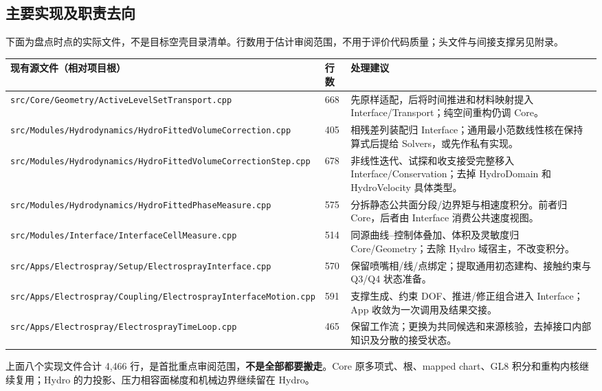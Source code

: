 \documentclass[UTF8,a4paper,11pt,fontset=fandol]{ctexart}
\newcommand{\code}[1]{\nolinkurl{#1}}
\begin{document}
\subsection{主要实现及职责去向}
下面为盘点时点的实际文件，不是目标空壳目录清单。行数用于估计审阅范围，不用于评价代码质量；头文件与间接支撑另见附录。
\begin{longtable}{@{}P{.42\textwidth}P{.09\textwidth}P{.43\textwidth}@{}}
\toprule 现有源文件（相对项目根） & 行数 & 处理建议\\\midrule\endhead
\code{src/Core/Geometry/ActiveLevelSetTransport.cpp} & 668 & 先原样适配，后将时间推进和材料映射提入 Interface/Transport；纯空间重构仍调 Core。\\
\code{src/Modules/Hydrodynamics/HydroFittedVolumeCorrection.cpp} & 405 & 相残差列装配归 Interface；通用最小范数线性核在保持算式后提给 Solvers，或先作私有实现。\\
\code{src/Modules/Hydrodynamics/HydroFittedVolumeCorrectionStep.cpp} & 678 & 非线性迭代、试探和收支接受完整移入 Interface/Conservation；去掉 HydroDomain 和 HydroVelocity 具体类型。\\
\code{src/Modules/Hydrodynamics/HydroFittedPhaseMeasure.cpp} & 575 & 分拆静态公共面分段/边界矩与相速度积分。前者归 Core，后者由 Interface 消费公共速度视图。\\
\code{src/Modules/Interface/InterfaceCellMeasure.cpp} & 514 & 同源曲线--控制体叠加、体积及灵敏度归 Core/Geometry；去除 Hydro 域宿主，不改变积分。\\
\code{src/Apps/Electrospray/Setup/ElectrosprayInterface.cpp} & 570 & 保留喷嘴相/线/点绑定；提取通用初态建构、接触约束与 Q3/Q4 状态准备。\\
\code{src/Apps/Electrospray/Coupling/ElectrosprayInterfaceMotion.cpp} & 591 & 支撑生成、约束 DOF、推进/修正组合进入 Interface；App 收敛为一次调用及结果交接。\\
\code{src/Apps/Electrospray/ElectrosprayTimeLoop.cpp} & 465 & 保留工作流；更换为共同候选和来源核验，去掉接口内部知识及分散的接受状态。\\
\bottomrule
\end{longtable}
上面八个实现文件合计 4,466 行，是首批重点审阅范围，\textbf{不是全部都要搬走}。Core 原多项式、根、mapped chart、GL8 积分和重构内核继续复用；Hydro 的力投影、压力相容面梯度和机械边界继续留在 Hydro。
\end{document}
